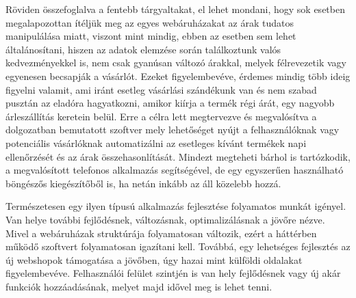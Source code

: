 Röviden összefoglalva a fentebb tárgyaltakat, el lehet mondani, hogy sok esetben megalapozottan ítéljük meg az egyes webáruházakat az árak tudatos manipulálása miatt, viszont mint mindig, ebben az esetben sem lehet általánosítani, hiszen az adatok elemzése során találkoztunk valós kedvezményekkel is, nem csak gyanúsan változó árakkal, melyek félrevezetik vagy egyenesen becsapják a vásárlót. Ezeket figyelembevéve, érdemes mindig több ideig figyelni valamit, ami iránt esetleg vásárlási szándékunk van és nem szabad pusztán az eladóra hagyatkozni, amikor kiírja a termék régi árát, egy nagyobb árleszállítás keretein belül. Erre a célra lett megtervezve és megvalósítva a dolgozatban bemutatott szoftver mely lehetőséget nyújt a felhasználóknak vagy potenciális vásárlóknak automatizálni az esetleges kívánt termékek napi ellenőrzését és az árak összehasonlítását. Mindezt megteheti bárhol is tartózkodik, a megvalósított telefonos alkalmazás segítségével, de egy egyszerűen használható böngészős kiegészítőből is, ha netán inkább az áll közelebb hozzá.

Természetesen egy ilyen típusú alkalmazás fejlesztése folyamatos munkát igényel. Van helye további fejlődésnek, változásnak, optimalizálásnak a jövőre nézve. Mivel a webáruházak struktúrája folyamatosan változik, ezért a háttérben működő szoftvert folyamatosan igazítani kell. Továbbá, egy lehetséges fejlesztés az új webshopok támogatása a jövőben, úgy hazai mint külföldi oldalakat figyelembevéve. Felhasználói felület szintjén is van hely fejlődésnek vagy új akár funkciók hozzáadásának, melyet majd idővel meg is lehet tenni.